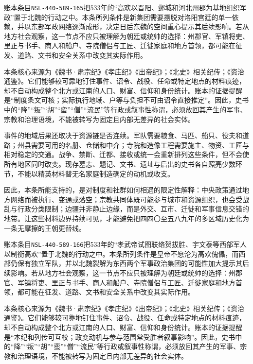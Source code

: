 账本条目\texttt{NSL-440-589-165}把533年的“高欢以晋阳、邺城和河北州郡为基地组织军政”置于北魏的行动之中。本条所列条件是新集团需要摆脱对洛阳宫廷的单一依赖，并以东部军政网络逐渐成形，决定日后东魏的空间重心提示其后续影响。若从地方社会观察，这一节点不应只被理解为朝廷或统帅的选择：州郡官、军镇将吏、里正与书手、商人和船户、寺院僧侣与工匠、迁徙家庭和地方首领，都可能在征发、道路、文书和安全关系中改变其实际作用。

本条核心来源为《魏书·肃宗纪》《孝庄纪》《出帝纪》；《北史》相关纪传；《资治通鉴》。它们能够较可靠地钉住事件、诏令、战役、任命或特定地点的材料痕迹，却不自动构成整个北方或江南的人口、财富、信仰和身份统计。账本的证据提醒是“制度条文可核；实际执行地域、户等与负担不可由诏令直接推定”。因此，史书中的“降”“叛”“胡”“蛮”“僧”“流民”等行政或叙事性称谓，必须放回其产生的军事、宗教和治理语境，不能被转写为固定且内部无差异的社会实体。

事件的地域后果还取决于资源链是否连续。军队需要粮食、马匹、船只、役夫和道路；州县需要可用的名册、仓储和中介；寺院和造像工程需要施主、物资、工匠与相对稳定的交通。战争、禁断、迁都、接收或统一会重新排列这些条件，但不会使所有地区同时改变。现存墓志、题记、文书、遗址与后出的史书各自照亮少数环节，不能以精英材料替无名家庭制造确定的动机或收支。

因此，本条所能支持的，是对制度和社群如何相遇的限定性解释：中央政策通过地方网络而被执行、变通或落空；宗教共同体既可能参与城市和资源组织，也会受战乱与行政分类限制；边疆并非静止边缘，而是外交、互市、迁徙和军事信息交错的地带。让这些材料边界持续可见，才能避免把四四〇至五八九年的多区域历史化为一条无摩擦的王朝更替线。

账本条目\texttt{NSL-440-589-166}把533年的“孝武帝试图联络贺拔胜、宇文泰等西部军人以制衡高欢”置于北魏的行动之中。本条所列条件是皇帝不愿沦为高欢傀儡，而西部仍保有独立军队，并以北魏裂解为东西两个军事政治集团的可能性加大提示其后续影响。若从地方社会观察，这一节点不应只被理解为朝廷或统帅的选择：州郡官、军镇将吏、里正与书手、商人和船户、寺院僧侣与工匠、迁徙家庭和地方首领，都可能在征发、道路、文书和安全关系中改变其实际作用。

本条核心来源为《魏书·肃宗纪》《孝庄纪》《出帝纪》；《北史》相关纪传；《资治通鉴》。它们能够较可靠地钉住事件、诏令、战役、任命或特定地点的材料痕迹，却不自动构成整个北方或江南的人口、财富、信仰和身份统计。账本的证据提醒是“本纪和列传可互校；政变动机与参与范围常受胜者叙事影响”。因此，史书中的“降”“叛”“胡”“蛮”“僧”“流民”等行政或叙事性称谓，必须放回其产生的军事、宗教和治理语境，不能被转写为固定且内部无差异的社会实体。

